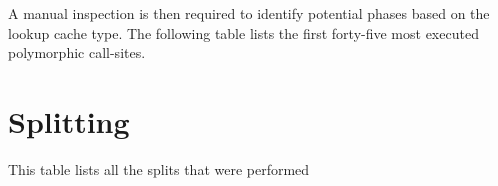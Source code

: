 \documentclass[preprint]{acmart}
\begin{document}
A manual inspection is then required to identify potential phases based on the lookup cache type. The following table lists the first forty-five most executed polymorphic call-sites.

\begin{landscape}

\SuperHottestMegamorphic{}

\end{landscape}

\appendix

\section{Splitting}

This table lists all the splits that were performed

\EffectSplitting



\end{document}
